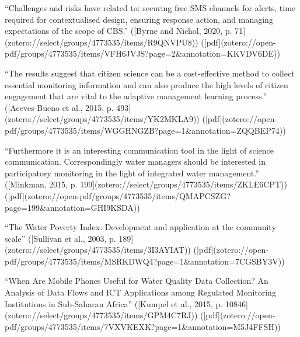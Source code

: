 
“Challenges and risks have related to: securing free SMS channels for alerts, time required for contextualised design, ensuring response action, and managing expectations of the scope of CBS.” ([Byrne and Nichol, 2020, p. 71](zotero://select/groups/4773535/items/R9QNVPU8)) ([pdf](zotero://open-pdf/groups/4773535/items/VFH6JVJS?page=2&annotation=KKVDV6DE))



“The results suggest that citizen science can be a cost-effective method to collect essential monitoring information and can also produce the high levels of citizen engagement that are vital to the adaptive management learning process.” ([Aceves-Bueno et al., 2015, p. 493](zotero://select/groups/4773535/items/YK2MKLA9)) ([pdf](zotero://open-pdf/groups/4773535/items/WGGHNGZB?page=1&annotation=ZQQBEP74))

“Furthermore it is an interesting communication tool in the light of science communication. Correspondingly water managers should be interested in participatory monitoring in the light of integrated water management.” ([Minkman, 2015, p. 199](zotero://select/groups/4773535/items/ZKLE6CPT)) ([pdf](zotero://open-pdf/groups/4773535/items/QMAPCSZG?page=199&annotation=GHI9KSDA))


“The Water Poverty Index: Development and application at the community scale” ([Sullivan et al., 2003, p. 189](zotero://select/groups/4773535/items/3I3AYIAT)) ([pdf](zotero://open-pdf/groups/4773535/items/MSRKDWQ4?page=1&annotation=7CGSBY3V))

“When Are Mobile Phones Useful for Water Quality Data Collection? An Analysis of Data Flows and ICT Applications among Regulated Monitoring Institutions in Sub-Saharan Africa” ([Kumpel et al., 2015, p. 10846](zotero://select/groups/4773535/items/GPM4C7RJ)) ([pdf](zotero://open-pdf/groups/4773535/items/7VXVKEXK?page=1&annotation=M5J4FFSH))

